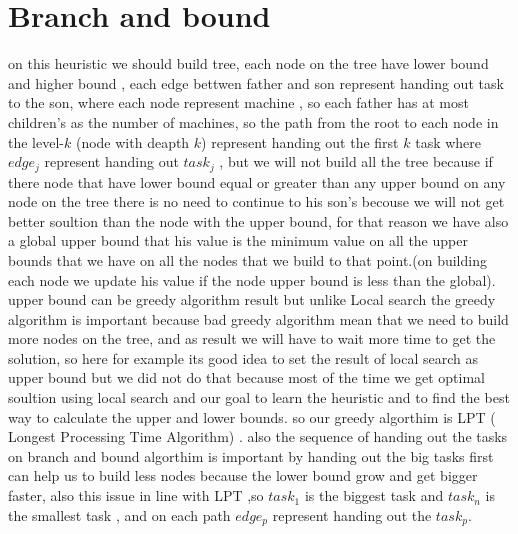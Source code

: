 \documentclass[11pt,fullpage]{article}
\begin{document}
\section{Branch and bound}
on this heuristic we should build tree, each node on the tree have lower bound and higher bound , each edge bettwen father and son represent handing out task to the son, where each node represent machine , so each father has at most children's as the number of machines, so the path from the root to each node in the level-$k$ (node with deapth $k$) represent handing out the first $k$ task where $edge_j$ represent handing out $task_j$  , but we will not build all the tree because if there node that have lower bound equal or greater than any upper bound on any node on the tree there is no need to continue to his son's becouse we will not get better soultion than the node with the upper bound, for that reason we have also a global upper bound that his value is the minimum value on all  the upper bounds that we have on all the nodes that we build to that point.(on building each node we update his value if the node upper bound is less than the global). upper bound can be greedy algorithm  result but unlike Local search the greedy algorithm is important because bad greedy algorithm mean that we need to build more nodes on the tree, and as result we will have to wait more time to get the solution, so here for example its good idea to set the result of local search as upper bound but we did not do that because  most of the time we get optimal soultion using local search and  our goal to learn the  heuristic and to find the best way to calculate the upper and lower bounds.\newline
so our greedy algorthim is LPT ( Longest Processing Time Algorithm) . also the sequence of handing out the tasks on branch and bound algorthim is important by handing out the big tasks first can help us to build less nodes because  the lower bound grow and get bigger faster, also this issue in line with LPT ,so $task_1$ is the biggest task and $task_n$ is the smallest task , and on each path  $edge_p$ represent handing out the $task_p$.\newline
\end{document}
